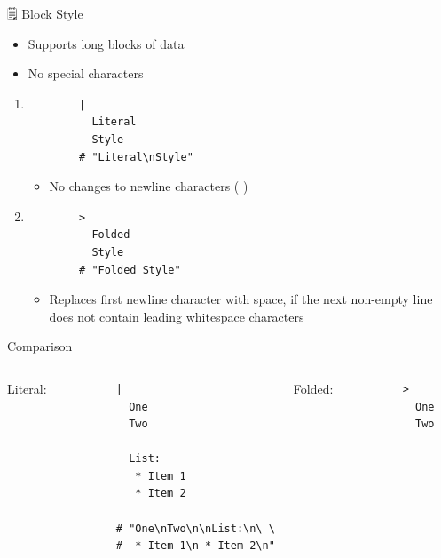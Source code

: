 \documentclass{beamer}
\newcommand{\code}[1]{
  \codebox{\texttt|#1|}
}
\begin{document}
\begin{frame}{🗒 Block Style}

  \begin{itemize}
    \item Supports long blocks of data
    \item No special characters
  \end{itemize}

  \begin{enumerate}
    \item
      \begin{verbatim}
        |
          Literal
          Style
        # "Literal\nStyle"
      \end{verbatim}
      \begin{itemize}
        \item No changes to newline characters (\code{\n})
      \end{itemize}

    \item
      \begin{verbatim}
        >
          Folded
          Style
        # "Folded Style"
      \end{verbatim}
      \begin{itemize}
        \item Replaces first newline character with space, if the next non-empty line does not contain leading whitespace characters
    \end{itemize}

  \end{enumerate}

  \newpage
  \hspace{0pt}
  \vspace{-1cm}
  \vfill
  \begin{block}{Comparison}\
    \begin{columns}

      Literal:\\[0.2cm]
      \begin{verbatim}
        |
          One
          Two

          List:
           * Item 1
           * Item 2

        # "One\nTwo\n\nList:\n\ \
        #  * Item 1\n * Item 2\n"
      \end{verbatim}

      Folded:\\[0.2cm]
      \begin{verbatim}
        >
          One
          Two


\end{verbatim}
\end{columns}
\end{block}
\end{frame}
\end{document}
